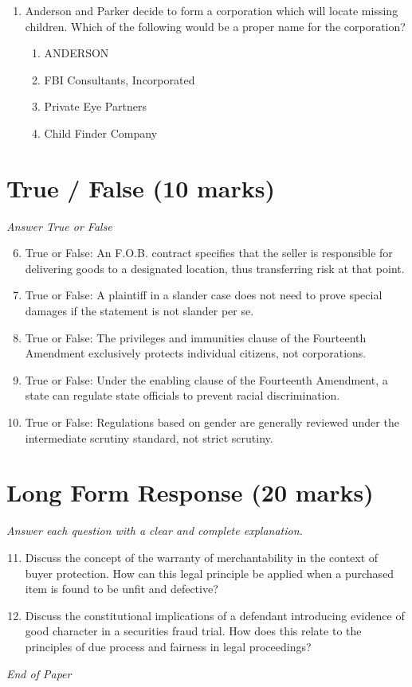 \documentclass[12pt]{article}
\begin{document}
\begin{enumerate}[label=\arabic*.]
\begin{enumerate}[label=(\alph*)]
    \item Equal protection problem
    \item Procedural due process problem
    \item None of these
\end{enumerate}
\item Anderson and Parker decide to form a corporation which will locate missing children. Which of the following would be a proper name for the corporation?
\begin{enumerate}[label=(\alph*)]
    \item ANDERSON
    \item FBI Consultants, Incorporated
    \item Private Eye Partners
    \item Child Finder Company
\end{enumerate}
\end{enumerate}

\section*{True / False (10 marks)}
\textit{Answer True or False}
\begin{enumerate}[label=\arabic*.]
\setcounter{enumi}{5}
\item True or False: An F.O.B. contract specifies that the seller is responsible for delivering goods to a designated location, thus transferring risk at that point.
\item True or False: A plaintiff in a slander case does not need to prove special damages if the statement is not slander per se.
\item True or False: The privileges and immunities clause of the Fourteenth Amendment exclusively protects individual citizens, not corporations.
\item True or False: Under the enabling clause of the Fourteenth Amendment, a state can regulate state officials to prevent racial discrimination.
\item True or False: Regulations based on gender are generally reviewed under the intermediate scrutiny standard, not strict scrutiny.
\end{enumerate}

\section*{Long Form Response (20 marks)}
\textit{Answer each question with a clear and complete explanation.}
\begin{enumerate}[label=\arabic*.]
\setcounter{enumi}{10}
\item Discuss the concept of the warranty of merchantability in the context of buyer protection. How can this legal principle be applied when a purchased item is found to be unfit and defective?
\item Discuss the constitutional implications of a defendant introducing evidence of good character in a securities fraud trial. How does this relate to the principles of due process and fairness in legal proceedings?
\end{enumerate}

\vfill
\noindent\textit{End of Paper}
\end{document}
